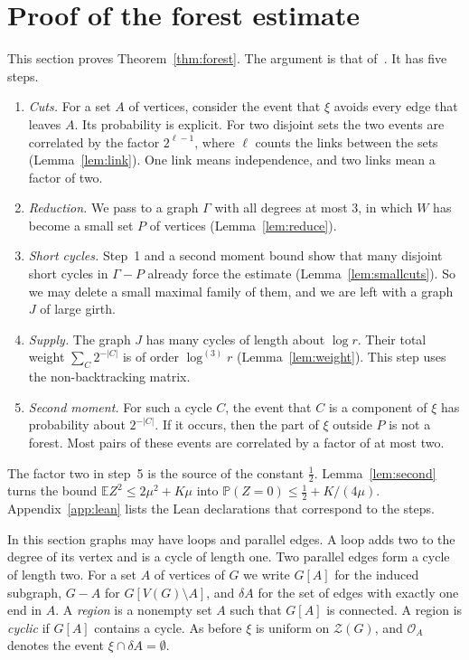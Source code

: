 \documentclass[11pt]{article}
\theoremstyle{definition}
\theoremstyle{remark}
\newcommand{\Z}{\mathcal{Z}}
\newcommand{\PP}{\mathbb{P}}
\newcommand{\EE}{\mathbb{E}}
\newcommand{\lgk}[1]{\log^{(#1)}}
\newcommand{\sm}{\setminus}
\newcommand{\half}{\tfrac12}
\newcommand{\cO}{\mathcal{O}}
\begin{document}
\section{Proof of the forest estimate}\label{sec:forest}

This section proves Theorem~\ref{thm:forest}. The argument is that of~\cite{KNT}. It has five steps.
\begin{enumerate}
\item \emph{Cuts.} For a set $A$ of vertices, consider the event that $\xi$ avoids every edge that
leaves $A$. Its probability is explicit. For two disjoint sets the two events are correlated by the
factor $2^{\ell-1}$, where $\ell$ counts the links between the sets (Lemma~\ref{lem:link}). One link
means independence, and two links mean a factor of two.
\item \emph{Reduction.} We pass to a graph $\Gamma$ with all degrees at most $3$, in which $W$ has
become a small set $P$ of vertices (Lemma~\ref{lem:reduce}).
\item \emph{Short cycles.} Step~1 and a second moment bound show that many disjoint short cycles in
$\Gamma-P$ already force the estimate (Lemma~\ref{lem:smallcuts}). So we may delete a small maximal
family of them, and we are left with a graph $J$ of large girth.
\item \emph{Supply.} The graph $J$ has many cycles of length about $\log r$. Their total weight
$\sum_C2^{-|C|}$ is of order $\lgk3r$ (Lemma~\ref{lem:weight}). This step uses the non-backtracking
matrix.
\item \emph{Second moment.} For such a cycle $C$, the event that $C$ is a component of $\xi$ has
probability about $2^{-|C|}$. If it occurs, then the part of $\xi$ outside $P$ is not a forest. Most
pairs of these events are correlated by a factor of at most two.
\end{enumerate}
The factor two in step~5 is the source of the constant $\half$. Lemma~\ref{lem:second} turns the
bound $\EE Z^{2}\le2\mu^{2}+K\mu$ into $\PP(Z=0)\le\half+K/(4\mu)$. Appendix~\ref{app:lean} lists the
Lean declarations that correspond to the steps.

In this section graphs may have loops and parallel edges. A loop adds two to the degree of its vertex
and is a cycle of length one. Two parallel edges form a cycle of length two. For a set $A$ of
vertices of $G$ we write $G[A]$ for the induced subgraph, $G-A$ for $G[V(G)\sm A]$, and $\delta A$
for the set of edges with exactly one end in $A$. A \emph{region} is a nonempty set $A$ such that
$G[A]$ is connected. A region is \emph{cyclic} if $G[A]$ contains a cycle. As before $\xi$ is
uniform on $\Z(G)$, and $\cO_A$ denotes the event $\xi\cap\delta A=\emptyset$.
\end{document}
